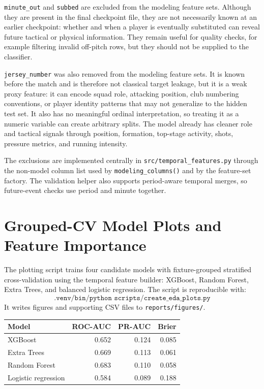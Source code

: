 \documentclass[11pt]{article}
\begin{document}
\texttt{minute\_out} and \texttt{subbed} are excluded from the modeling feature sets.
Although they are present in the final checkpoint file, they are not necessarily known at an earlier checkpoint: whether and when a player is eventually substituted can reveal future tactical or physical information.
They remain useful for quality checks, for example filtering invalid off-pitch rows, but they should not be supplied to the classifier.

\texttt{jersey\_number} was also removed from the modeling feature sets.
It is known before the match and is therefore not classical target leakage, but it is a weak proxy feature: it can encode squad role, attacking position, club numbering conventions, or player identity patterns that may not generalize to the hidden test set.
It also has no meaningful ordinal interpretation, so treating it as a numeric variable can create arbitrary splits.
The model already has cleaner role and tactical signals through position, formation, top-stage activity, shots, pressure metrics, and running intensity.

The exclusions are implemented centrally in \texttt{src/temporal\_features.py} through the non-model column list used by \texttt{modeling\_columns()} and by the feature-set factory.
The validation helper also supports period-aware temporal merges, so future-event checks use period and minute together.

\section{Grouped-CV Model Plots and Feature Importance}
The plotting script trains four candidate models with fixture-grouped stratified cross-validation using the temporal feature builder: XGBoost, Random Forest, Extra Trees, and balanced logistic regression.
The script is reproducible with:
\[
\texttt{.venv/bin/python scripts/create\_eda\_plots.py}
\]
It writes figures and supporting CSV files to \texttt{reports/figures/}.

\begin{longtable}{lrrr}
\toprule
Model & ROC-AUC & PR-AUC & Brier \\
\midrule
XGBoost & 0.652 & 0.124 & 0.085 \\
Extra Trees & 0.669 & 0.113 & 0.061 \\
Random Forest & 0.683 & 0.110 & 0.058 \\
Logistic regression & 0.584 & 0.089 & 0.188 \\
\bottomrule
\end{longtable}
\end{document}
